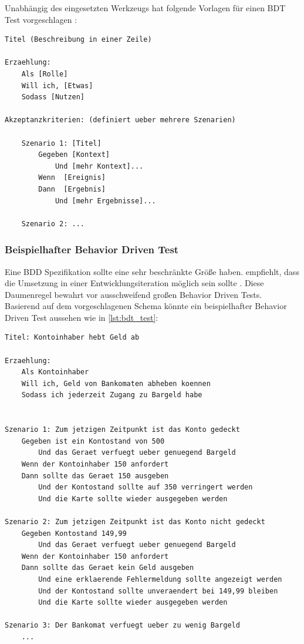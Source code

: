 Unabhängig des eingesetzten Werkzeugs hat \citeauthor{north_whats_2007} folgende Vorlagen für einen \Gls{BDT} Test vorgeschlagen \cite{north_whats_2007}:

\begin{lstlisting}[caption=Vorlage für Behavior Driven Tests in Prosatext, label=lst:bdt_template]
Titel (Beschreibung in einer Zeile)
 
Erzaehlung:
	Als [Rolle]
	Will ich, [Etwas]
	Sodass [Nutzen]
 
Akzeptanzkriterien: (definiert ueber mehrere Szenarien)
 
	Szenario 1: [Titel]
		Gegeben [Kontext]
	  		Und [mehr Kontext]...
		Wenn  [Ereignis]
		Dann  [Ergebnis]
	  		Und [mehr Ergebnisse]...
	 
	Szenario 2: ...
\end{lstlisting}

\subsubsection{Beispielhafter Behavior Driven Test}
\label{sec:bdt_bsp}
Eine \Gls{BDD} Spezifikation sollte eine sehr beschränkte Größe haben. \citeauthor{north_whats_2007} empfiehlt, dass die Umsetzung in einer Entwicklungsiteration möglich sein sollte \cite{north_whats_2007}. Diese Daumenregel bewahrt vor ausschweifend großen Behavior Driven Tests.\\
Basierend auf dem vorgeschlagenen Schema könnte ein beispielhafter Behavior Driven Test aussehen wie in \ref{lst:bdt_test}:

\begin{lstlisting}[caption=Beispielhafter Behavior Driven Test, label=lst:bdt_test]
Titel: Kontoinhaber hebt Geld ab
 
Erzaehlung:
	Als Kontoinhaber
	Will ich, Geld von Bankomaten abheben koennen
	Sodass ich jederzeit Zugang zu Bargeld habe
 
 
Szenario 1: Zum jetzigen Zeitpunkt ist das Konto gedeckt
	Gegeben ist ein Kontostand von 500
  		Und das Geraet verfuegt ueber genuegend Bargeld
	Wenn der Kontoinhaber 150 anfordert
	Dann sollte das Geraet 150 ausgeben
  		Und der Kontostand sollte auf 350 verringert werden
  		Und die Karte sollte wieder ausgegeben werden
 
Szenario 2: Zum jetzigen Zeitpunkt ist das Konto nicht gedeckt
	Gegeben Kontostand 149,99
  		Und das Geraet verfuegt ueber genuegend Bargeld
	Wenn der Kontoinhaber 150 anfordert
	Dann sollte das Geraet kein Geld ausgeben
		Und eine erklaerende Fehlermeldung sollte angezeigt werden
  		Und der Kontostand sollte unveraendert bei 149,99 bleiben
  		Und die Karte sollte wieder ausgegeben werden

Szenario 3: Der Bankomat verfuegt ueber zu wenig Bargeld
	...
\end{lstlisting}

